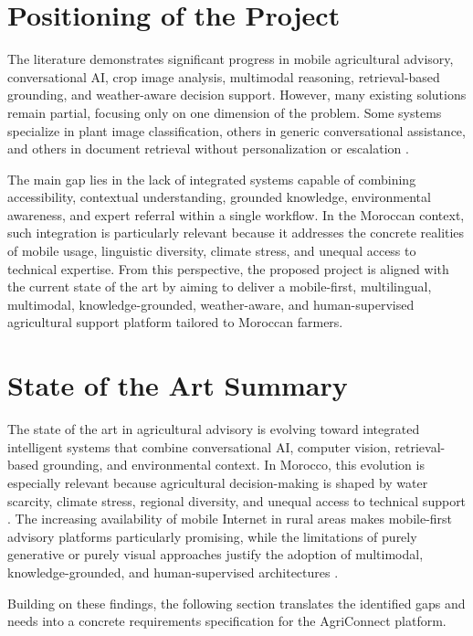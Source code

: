 \section{Positioning of the Project}

The literature demonstrates significant progress in mobile agricultural advisory, conversational AI, crop image analysis, multimodal reasoning, retrieval-based grounding, and weather-aware decision support. However, many existing solutions remain partial, focusing only on one dimension of the problem. Some systems specialize in plant image classification, others in generic conversational assistance, and others in document retrieval without personalization or escalation \cite{li2025llm,zhu2025vlm,yin2025foundation}.

The main gap lies in the lack of integrated systems capable of combining accessibility, contextual understanding, grounded knowledge, environmental awareness, and expert referral within a single workflow. In the Moroccan context, such integration is particularly relevant because it addresses the concrete realities of mobile usage, linguistic diversity, climate stress, and unequal access to technical expertise. From this perspective, the proposed project is aligned with the current state of the art by aiming to deliver a mobile-first, multilingual, multimodal, knowledge-grounded, weather-aware, and human-supervised agricultural support platform tailored to Moroccan farmers.

\section{State of the Art Summary}

The state of the art in agricultural advisory is evolving toward integrated intelligent systems that combine conversational AI, computer vision, retrieval-based grounding, and environmental context. In Morocco, this evolution is especially relevant because agricultural decision-making is shaped by water scarcity, climate stress, regional diversity, and unequal access to technical support \cite{generationgreen2020,worldbank2024irrigation,anrt2025}. The increasing availability of mobile Internet in rural areas makes mobile-first advisory platforms particularly promising, while the limitations of purely generative or purely visual approaches justify the adoption of multimodal, knowledge-grounded, and human-supervised architectures \cite{anrt2025,li2025llm,zhu2025vlm,yin2025foundation}.

Building on these findings, the following section translates the identified gaps and needs into a concrete requirements specification for the AgriConnect platform.
